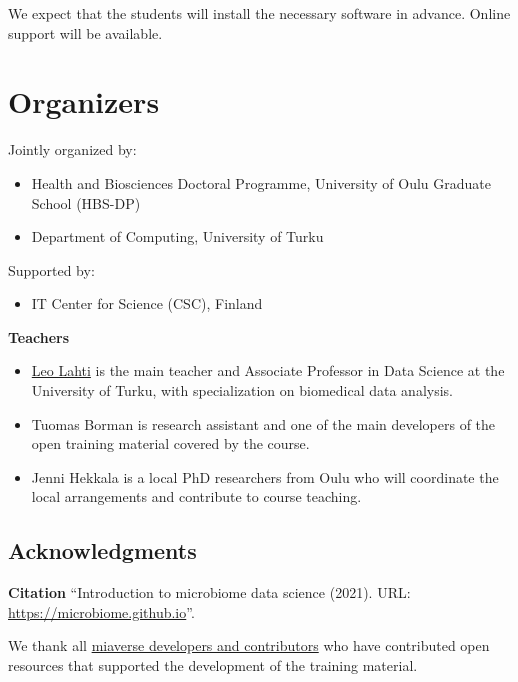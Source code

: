 \documentclass[
  oneside]{book}
\providecommand{\tightlist}{%
  \setlength{\itemsep}{0pt}\setlength{\parskip}{0pt}}
\begin{document}
We expect that the students will install the necessary software in
advance. Online support will be available.

\hypertarget{organizers}{%
\chapter{Organizers}\label{organizers}}

Jointly organized by:

\begin{itemize}
\tightlist
\item
  Health and Biosciences Doctoral Programme, University of Oulu Graduate School (HBS-DP)
\item
  Department of Computing, University of Turku
\end{itemize}

Supported by:

\begin{itemize}
\tightlist
\item
  IT Center for Science (CSC), Finland
\end{itemize}

\textbf{Teachers}

\begin{itemize}
\item
  \href{https://datascience.utu.fi}{Leo Lahti} is the main teacher and
  Associate Professor in Data Science at the University of Turku,
  with specialization on biomedical data analysis.
\item
  Tuomas Borman is research assistant and one of the main developers
  of the open training material covered by the course.
\item
  Jenni Hekkala is a local PhD researchers from Oulu who will
  coordinate the local arrangements and contribute to course
  teaching.
\end{itemize}

\hypertarget{acknowledgments}{%
\section{Acknowledgments}\label{acknowledgments}}

\textbf{Citation} ``Introduction to microbiome data science (2021). URL: \url{https://microbiome.github.io}''.

\citet{oulu2022course}

We thank all \href{https://microbiome.github.io}{miaverse developers and contributors} who have contributed open resources that supported the development of the training material.
\end{document}
